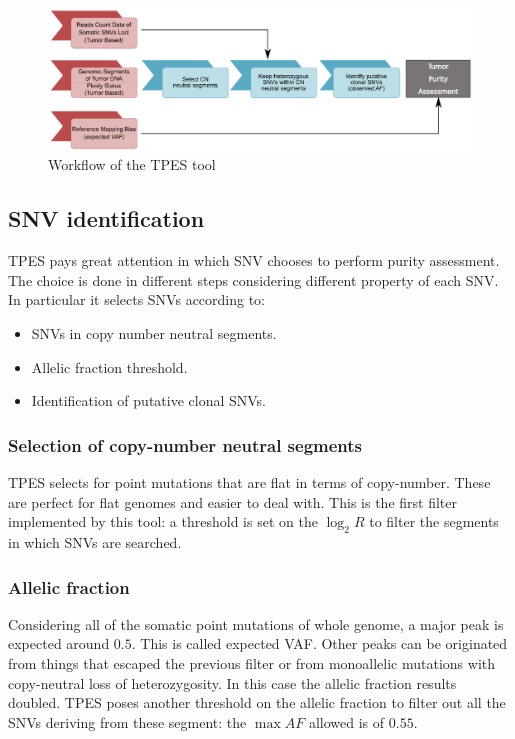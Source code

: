     \begin{figure}[H]
    \centering
        \includegraphics[width=0.7\linewidth]{tpes.png}
        \caption{Workflow of the TPES tool}
        \label{fig:tpes}
    \end{figure}

    \subsection{SNV identification}
    TPES pays great attention in which SNV chooses to perform purity assessment.
    The choice is done in different steps considering different property of each SNV.
    In particular it selects SNVs according to:

    \begin{multicols}{2}
        \begin{itemize}
            \item SNVs in copy number neutral segments.
            \item Allelic fraction threshold.
            \item Identification of putative clonal SNVs.
        \end{itemize}
    \end{multicols}

        \subsubsection{Selection of copy-number neutral segments}
        TPES selects for point mutations that are flat in terms of copy-number.
        These are perfect for flat genomes and easier to deal with.
        This is the first filter implemented by this tool: a threshold is set on the $\log_2 R$ to filter the segments in which SNVs are searched.

        \subsubsection{Allelic fraction}
        Considering all of the somatic point mutations of whole genome, a major peak is expected around $0.5$.
        This is called expected VAF.
        Other peaks can be originated from things that escaped the previous filter or from monoallelic mutations with copy-neutral loss of heterozygosity.
        In this case the allelic fraction results doubled.
        TPES poses another threshold on the allelic fraction to filter out all the SNVs deriving from these segment: the $\max AF$ allowed is of $0.55$.

